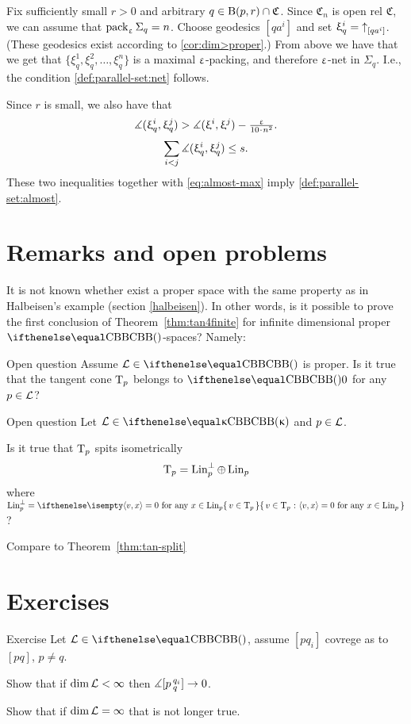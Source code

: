 Fix sufficiently small $r>0$
and arbitrary $q\in \oBall(p,r)\cap \mathfrak{C}$.
Since $\mathfrak{C}_n$ is open rel $\mathfrak{C}$,
we can assume that $\mathop{\rm pack}\nolimits_\upvarepsilon\Sigma_q=n$.
Choose
 geodesics $[qa^i]$ 
and set $\upxi^i_q={\uparrow}_{[{q}{a^i}]}$.
(These geodesics exist according to \ref{cor:dim>proper}.)
From above we have that
we get that $\{\xi^1_q,\xi^2_q,\dots,\xi^n_q\}$ is a maximal $\upvarepsilon$-packing, and therefore $\upvarepsilon$-net in $\Sigma_q$.
I.e., the condition \ref{def:parallel-set:net} follows.

Since $r$ is small, we also have that
\[\mangle(\xi^i_q,\xi^j_q)>\mangle(\xi^i,\xi^j)-\tfrac{\eps}{10\cdot n^2}.\] 
\[\sum_{i<j}\mangle(\xi^i_q,\xi^j_q)\le s.\]
These two inequalities together with \ref{eq:almost-max} imply \ref{def:parallel-set:almost}.
\qeds




\section{Remarks and open problems}

It is not known whether exist a proper space with the same property as in Halbeisen's example (section \ref{halbeisen}).
In other words, 
is it possible to  prove the first conclusion of Theorem~\ref{thm:tan4finite} 
for infinite dimensional proper $\Alex{}{}$-spaces?
Namely:

\begin{thm}{Open question}\label{open:Halb-proper}
Assume $\spc{L}\in\Alex{}{}$ is proper. 
Is it true that the tangent cone $\text{\rm T}_p$ belongs to $\Alex{}{0}$ for any $p\in\spc{L}$?
\end{thm}

\begin{thm}{Open question}\label{open:split-inf-dim}
Let $\spc{L}\in\Alex\kappa$ and $p\in \spc{L}$.

Is it true that $\text{\rm T}_p$ spits isometrically
\[\text{\rm T}_p=\mathop{\rm Lin}\nolimits_p^\perp\oplus\mathop{\rm Lin}\nolimits_p\]
where 
$\Lin_p^\perp=\set{v\in \T_p}{\<v,x\>=0\ \text{for any}\ x\in\Lin_p}$?
\end{thm}

Compare to Theorem~\ref{thm:tan-split}


\section{Exercises}

\begin{thm}{Exercise}
Let $\spc{L}\in\Alex{}{}$, assume $[pq_i]$ covrege as to $[pq]$, $p\not=q$. 

Show that if $\mathop{\rm dim}\nolimits\mathcal{L}<\infty$ then $\mangle\hinge p{q_i}{q}\to0$.

Show that if $\mathop{\rm dim}\nolimits\mathcal{L}=\infty$ that is not longer true.
\end{thm}





